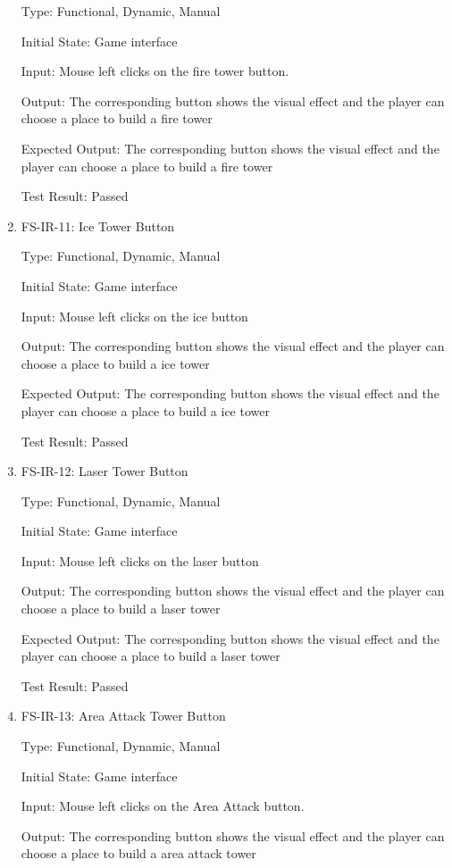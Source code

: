 \documentclass[12pt]{article}
\begin{document}
\begin{enumerate}
	Type: Functional, Dynamic, Manual
					
	Initial State: Game interface
					
	Input: Mouse left clicks on the fire tower button.
					
	Output: The corresponding button shows the visual effect and the player can choose a place to build a fire tower
					
	Expected Output: The corresponding button shows the visual effect and the player can choose a place to build a fire tower
	
	Test Result: Passed
	
	\item{FS-IR-11: Ice Tower Button}
					
	Type: Functional, Dynamic, Manual
					
	Initial State: Game interface
					
	Input: Mouse left clicks on the ice button
					
	Output: The corresponding button shows the visual effect and the player can choose a place to build a ice tower
					
	Expected Output: The corresponding button shows the visual effect and the player can choose a place to build a ice tower
	
	Test Result: Passed
	
	\item{FS-IR-12: Laser Tower Button}
					
	Type: Functional, Dynamic, Manual
					
	Initial State: Game interface
					
	Input: Mouse left clicks on the laser button
					
	Output: The corresponding button shows the visual effect and the player can choose a place to build a laser tower
					
	Expected Output: The corresponding button shows the visual effect and the player can choose a place to build a laser tower
	
	Test Result: Passed
	
	
	\item{FS-IR-13: Area Attack Tower Button}
					
	Type: Functional, Dynamic, Manual
					
	Initial State: Game interface
					
	Input: Mouse left clicks on the Area Attack button.
					
	Output: The corresponding button shows the visual effect and the player can choose a place to build a area attack tower
					

\end{enumerate}
\end{document}
